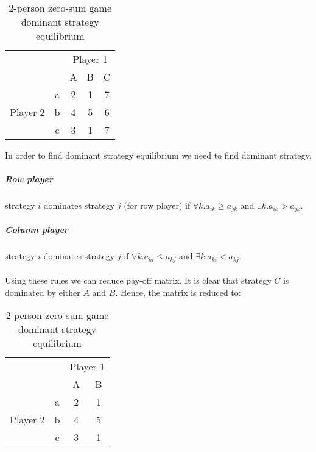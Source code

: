 \documentclass[10pt, a4paper]{report}
\begin{document}
\begin{table}[ht!]
	\hspace{-4em}
	\centering
	\begin{tabular}{ccccc|}
		& & \multicolumn{3}{c}{Player 1}                                \\ \cline{3-5}
		& & A & B & \multicolumn{1}{c}{C}                               \\ \cline{3-5}
		\multirow{3}{*}{Player 2} & \multicolumn{1}{|c|}{a} & 2 & 1 & 7 \\
		& \multicolumn{1}{|c|}{b} & 4 & 5 & 6                           \\
		& \multicolumn{1}{|c|}{c} & 3 & 1 & 7                           \\ \cline{3-5}
	\end{tabular}
	\caption{2-person zero-sum game\\ dominant strategy equilibrium}
\end{table}
In order to find dominant strategy equilibrium we need to find dominant strategy.
\subparagraph{Row player} strategy $i$ dominates strategy $j$ (for row player) if $\forall k. a_{ik} \ge a_{jk}$ and $\exists k.a_{ik} > a_{jk}$.
\subparagraph{Column player} strategy $i$ dominates strategy $j$ if $\forall k. a_{ki} \le a_{kj}$ and $\exists k.a_{ki} < a_{kj}$.
\\\\
Using these rules we can reduce pay-off matrix. It is clear that strategy $C$ is dominated by either $A$ and $B$. Hence, the matrix is reduced to:
\begin{table}[ht!]
	\hspace{-4em}
	\centering
	\begin{tabular}{cccc|}
		& & \multicolumn{2}{c}{Player 1}                            \\ \cline{3-4}
		& & A & \multicolumn{1}{c}{B}                               \\ \cline{3-4}
		\multirow{3}{*}{Player 2} & \multicolumn{1}{|c|}{a} & 2 & 1 \\
		& \multicolumn{1}{|c|}{b} & 4 & 5                           \\
		& \multicolumn{1}{|c|}{c} & 3 & 1                           \\ \cline{3-4}
	\end{tabular}
	\caption{2-person zero-sum game\\ dominant strategy equilibrium}
\end{table}
\\\\
\end{document}
